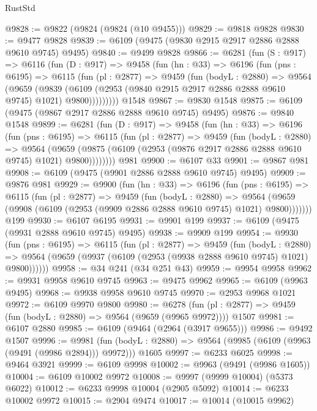 \begin{lexlean}{RustStd}
\begin{coremodule}
@9828 := @9822 (@9824 (@9824 (@10 @9455)))
@9829 := @9818 @9828
@9830 := @9477 @9828
@9839 := @6109 (@9475 (@9830 @2915 @2917 @2886 @2888 @9610 @9745) @9495)
@9840 := @9499 @9828
@9866 := @6281
    (fun (S : @917) =>
    @6116
      (fun (D : @917) =>
      @9458
        (fun (hn : @33) =>
        @6196
          (fun (pns : @6195) =>
          @6115
            (fun (pl : @2877) =>
            @9459
              (fun (bodyL : @2880) =>
              @9564
                (@9659
                  (@9839
                    (@6109 (@2953 (@9840 @2915 @2917 @2886 @2888 @9610 @9745) @1021) @9800)))))))))
    @1548
@9867 := @9830 @1548
@9875 := @6109 (@9475 (@9867 @2917 @2886 @2888 @9610 @9745) @9495)
@9876 := @9840 @1548
@9899 := @6281
    (fun (D : @917) =>
    @9458
      (fun (hn : @33) =>
      @6196
        (fun (pns : @6195) =>
        @6115
          (fun (pl : @2877) =>
          @9459
            (fun (bodyL : @2880) =>
            @9564
              (@9659 (@9875 (@6109 (@2953 (@9876 @2917 @2886 @2888 @9610 @9745) @1021) @9800))))))))
    @981
@9900 := @6107 @33
@9901 := @9867 @981
@9908 := @6109 (@9475 (@9901 @2886 @2888 @9610 @9745) @9495)
@9909 := @9876 @981
@9929 := @9900
    (fun (hn : @33) =>
    @6196
      (fun (pns : @6195) =>
      @6115
        (fun (pl : @2877) =>
        @9459
          (fun (bodyL : @2880) =>
          @9564 (@9659 (@9908 (@6109 (@2953 (@9909 @2886 @2888 @9610 @9745) @1021) @9800)))))))
    @199
@9930 := @6107 @6195
@9931 := @9901 @199
@9937 := @6109 (@9475 (@9931 @2888 @9610 @9745) @9495)
@9938 := @9909 @199
@9954 := @9930
    (fun (pns : @6195) =>
    @6115
      (fun (pl : @2877) =>
      @9459
        (fun (bodyL : @2880) =>
        @9564 (@9659 (@9937 (@6109 (@2953 (@9938 @2888 @9610 @9745) @1021) @9800))))))
@9958 := @34 @241 (@34 @251 @43)
@9959 := @9954 @9958
@9962 := @9931 @9958 @9610 @9745
@9963 := @9475 @9962
@9965 := @6109 (@9963 @9495)
@9968 := @9938 @9958 @9610 @9745
@9970 := @2953 @9968 @1021
@9972 := @6109 @9970 @9800
@9980 := @6278
    (fun (pl : @2877) => @9459 (fun (bodyL : @2880) => @9564 (@9659 (@9965 @9972))))
    @1507
@9981 := @6107 @2880
@9985 := @6109 (@9464 (@2964 (@3917 @9655)))
@9986 := @9492 @1507
@9996 := @9981
    (fun (bodyL : @2880) => @9564 (@9985 (@6109 (@9963 (@9491 (@9986 @2894))) @9972)))
    @1605
@9997 := @6233 @6025
@9998 := @9464 @3921
@9999 := @6109 @9998
@10002 := @9963 (@9491 (@9986 @1605))
@10004 := @6109 @10002 @9972
@10008 := @9997 (@9999 @10004) (@5373 @6022)
@10012 := @6233 @9998 @10004 (@2905 @5092)
@10014 := @6233 @10002 @9972
@10015 := @2904 @9474
@10017 := @10014 (@10015 @9962)

\end{coremodule}
\end{lexlean}
